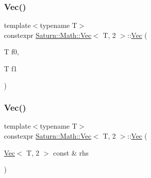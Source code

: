 \mbox{\label{class_saturn_1_1_math_1_1_vec_3_01_t_00_012_01_4_a85995607beb50c26942e181386b19e1f}} 
\subsubsection{\texorpdfstring{Vec()}{Vec()}\hspace{0.1cm}{\footnotesize\ttfamily [3/4]}}
{\footnotesize\ttfamily template$<$typename T$>$ \\
constexpr \mbox{\hyperlink{class_saturn_1_1_math_1_1_vec}{Saturn\+::\+Math\+::\+Vec}}$<$ T, 2 $>$\+::\mbox{\hyperlink{class_saturn_1_1_math_1_1_vec}{Vec}} (\begin{DoxyParamCaption}\item[{T}]{f0,  }\item[{T}]{f1 }\end{DoxyParamCaption})\hspace{0.3cm}{\ttfamily [inline]}}

\mbox{\label{class_saturn_1_1_math_1_1_vec_3_01_t_00_012_01_4_ae5ad36ab0decbf62688635099c3db0a6}} 
\subsubsection{\texorpdfstring{Vec()}{Vec()}\hspace{0.1cm}{\footnotesize\ttfamily [4/4]}}
{\footnotesize\ttfamily template$<$typename T$>$ \\
constexpr \mbox{\hyperlink{class_saturn_1_1_math_1_1_vec}{Saturn\+::\+Math\+::\+Vec}}$<$ T, 2 $>$\+::\mbox{\hyperlink{class_saturn_1_1_math_1_1_vec}{Vec}} (\begin{DoxyParamCaption}\item[{\mbox{\hyperlink{class_saturn_1_1_math_1_1_vec}{Vec}}$<$ T, 2 $>$ const \&}]{rhs }\end{DoxyParamCaption})\hspace{0.3cm}{\ttfamily [inline]}}



